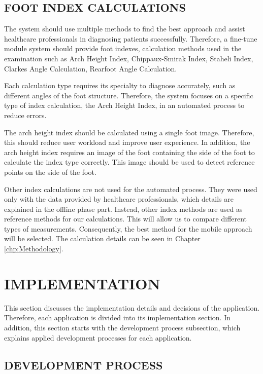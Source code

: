 \subsection{ FOOT INDEX CALCULATIONS }

The system should use multiple methods to find the best approach and assist healthcare professionals in diagnosing patients successfully. Therefore, a fine-tune module system should provide foot indexes, calculation methods used in the examination such as Arch Height Index, Chippaux-Smirak Index, Staheli Index, Clarkes Angle Calculation, Rearfoot Angle Calculation. 

Each calculation type requires its specialty to diagnose accurately, such as different angles of the foot structure. Therefore, the system focuses on a specific type of index calculation, the Arch Height Index, in an automated process to reduce errors. 

The arch height index should be calculated using a single foot image. Therefore, this should reduce user workload and improve user experience. In addition, the arch height index requires an image of the foot containing the side of the foot to calculate the index type correctly. This image should be used to detect reference points on the side of the foot. 

Other index calculations are not used for the automated process. They were used only with the data provided by healthcare professionals, which details are explained in the offline phase part. Instead, other index methods are used as reference methods for our calculations. This will allow us to compare different types of measurements. Consequently, the best method for the mobile approach will be selected. The calculation details can be seen in Chapter \ref{chp:Methodology}.

\section{IMPLEMENTATION}\label{sec:StudyIImplementation}

This section discusses the implementation details and decisions of the application. Therefore, each application is divided into its implementation section. In addition, this section starts with the development process subsection, which explains applied development processes for each application.

\subsection{DEVELOPMENT PROCESS}

